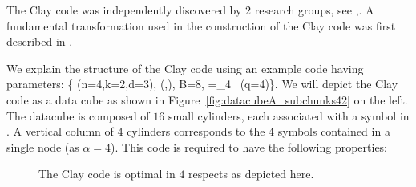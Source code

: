\begin{multicols}{2}
 The Clay code was independently discovered by $2$ research groups, see \cite{YeBargPCTCode},\cite{SasVajhaKum16}.  A fundamental transformation used in the construction of the Clay code was first described in \cite{TianLiTangISIT17}. 
 
 We explain the structure of the Clay code using an example code having parameters:
 \bean
 \{ (n=4,k=2,d=3), (,), B=8, \fq=_4 \ (q=4)\}. 
 \eean
 We will depict the Clay code as a data cube as shown in Figure~\ref{fig:datacubeA_subchunks42} on the left.  The datacube is composed of $16$ small cylinders, each associated with a symbol in \fq.  A vertical column of $4$ cylinders corresponds to the $4$ symbols contained in a single node (as $\alpha=4$). This code is required to have the following properties:

 \begin{figure}[H]
 	\centering
 		\caption{The Clay code is optimal in $4$ respects as depicted here.}  \label{fig:4way_optimality}  
 \end{figure}


\end{multicols}
